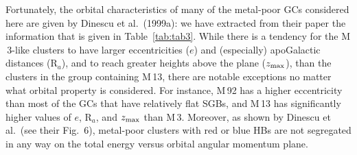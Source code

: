\documentclass[12pt,preprint]{aastex}
\begin{document}
Fortunately, the orbital characteristics of many of the metal-poor GCs
considered here are given by Dinescu et al.~(1999a): we have extracted from
their paper the information that is given in Table~\ref{tab:tab3}.  While
there is a tendency for the M$\,$3-like clusters to have larger eccentricities
($e$) and (especially) apoGalactic distances (R$_a$), and to reach greater
heights above the plane ($z_{\rm max}$), than the clusters in the group
containing M$\,$13, there are notable exceptions no matter what orbital property
is considered.  For instance, M$\,$92 has a higher eccentricity than most of
the GCs that have relatively flat SGBs, and M$\,$13 has significantly higher
values of $e$, R$_a$, and $z_{\rm max}$ than M$\,$3.  Moreover, as shown by
Dinescu et al.~(see their Fig.~6), metal-poor clusters with red or blue HBs are
not segregated in any way on the total energy versus orbital angular momentum
plane.
\end{document}

